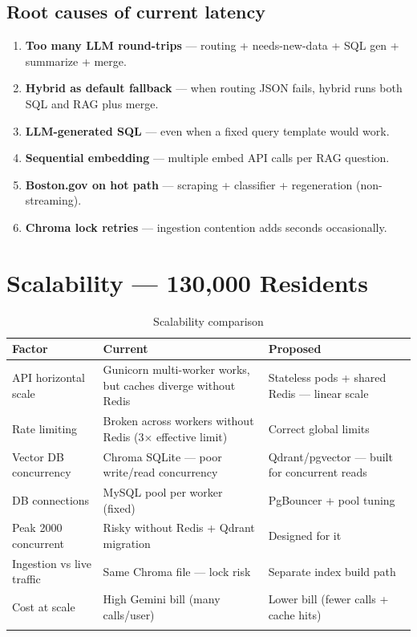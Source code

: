 \documentclass[11pt,a4paper]{article}
\begin{document}
\subsection{Root causes of current latency}
\begin{enumerate}
  \item \textbf{Too many LLM round-trips} --- routing + needs-new-data + SQL gen + summarize + merge.
  \item \textbf{Hybrid as default fallback} --- when routing JSON fails, hybrid runs both SQL and RAG plus merge.
  \item \textbf{LLM-generated SQL} --- even when a fixed query template would work.
  \item \textbf{Sequential embedding} --- multiple embed API calls per RAG question.
  \item \textbf{Boston.gov on hot path} --- scraping + classifier + regeneration (non-streaming).
  \item \textbf{Chroma lock retries} --- ingestion contention adds seconds occasionally.
\end{enumerate}

\section{Scalability --- 130,000 Residents}

\begin{longtable}{@{}p{3.2cm}p{5.3cm}p{5.3cm}@{}}
\toprule
\textbf{Factor} & \textbf{Current} & \textbf{Proposed} \\
\midrule
\endhead
API horizontal scale & Gunicorn multi-worker works, but caches diverge without Redis & Stateless pods + shared Redis --- linear scale \\
Rate limiting & Broken across workers without Redis (3$\times$ effective limit) & Correct global limits \\
Vector DB concurrency & Chroma SQLite --- poor write/read concurrency & Qdrant/pgvector --- built for concurrent reads \\
DB connections & MySQL pool per worker (fixed) & PgBouncer + pool tuning \\
Peak 2000 concurrent & Risky without Redis + Qdrant migration & Designed for it \\
Ingestion vs live traffic & Same Chroma file --- lock risk & Separate index build path \\
Cost at scale & High Gemini bill (many calls/user) & Lower bill (fewer calls + cache hits) \\
\bottomrule
\caption{Scalability comparison}
\end{longtable}
\end{document}
